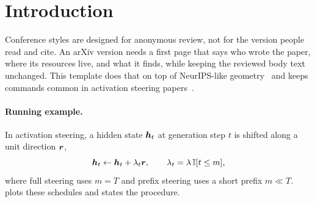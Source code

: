 \section{Introduction}

Conference styles are designed for anonymous review, not for the version people read and cite. An arXiv version needs a first page that says who wrote the paper, where its resources live, and what it finds, while keeping the reviewed body text unchanged. This template does that on top of NeurIPS-like geometry~\citep{NEURIPS2020_1457c0d6} and keeps commands common in activation steering papers~\citep{turner2023steering, rimsky-etal-2024-steering, zou2023transparency}.


\paragraph{Running example.} In activation steering, a hidden state $\boldsymbol{h}_t$ at generation step $t$ is shifted along a unit direction $\boldsymbol{r}$,
\begin{equation}\label{eq:steer}
\boldsymbol{h}_t \leftarrow \boldsymbol{h}_t + \lambda_t \boldsymbol{r}, \qquad \lambda_t = \lambda\,\mathbb{I}[t \le m],
\end{equation}
where full steering uses $m = T$ and prefix steering uses a short prefix $m \ll T$.  plots these schedules and  states the procedure.
